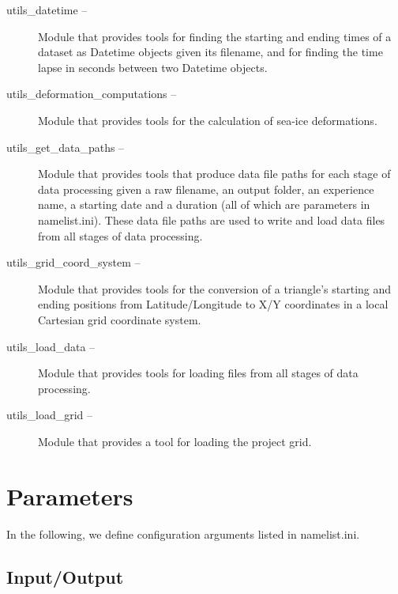 \documentclass[draft]{agujournal2018}
\begin{document}
\begin{description}
   
    \item[utils\_datetime --] Module that provides tools for finding the starting and ending times of a dataset as Datetime objects given its filename, and for finding the time lapse in seconds between two Datetime objects.
    
    \item[utils\_deformation\_computations --] Module that provides tools for the calculation of sea-ice deformations.      
    
    \item[utils\_get\_data\_paths --]  Module that provides tools that produce data file paths for each stage of data processing given a raw filename, an output folder, an experience name, a starting date and a duration (all of which are parameters in namelist.ini). These data file paths are used to write and load data files from all stages of data processing.
    
    \item[utils\_grid\_coord\_system --] Module that provides tools for the conversion of a triangle's starting and ending positions from Latitude/Longitude to X/Y coordinates in a local Cartesian grid coordinate system.
    
    \item[utils\_load\_data --] Module that provides tools for loading files from all stages of data processing. 
    
    \item[utils\_load\_grid --] Module that provides a tool for loading the project grid.

    
\end{description}


\begin{description}
  \item[]
    
\end{description}

\section{Parameters}

In the following, we define configuration arguments listed in namelist.ini.

\subsection{Input/Output}
\end{document}
